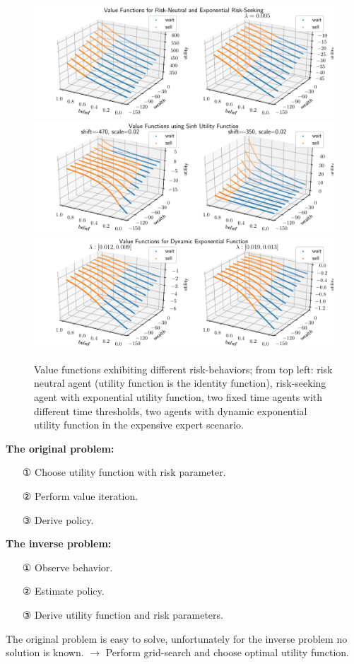 \begin{figure}
    \includegraphics[width=0.9\linewidth]{img/exp_policy.pdf}\\
    \includegraphics[width=0.9\linewidth]{img/sinh_policy.pdf}\\
    \includegraphics[width=0.9\linewidth]{img/dyn_policy.pdf}
    \caption{Value functions exhibiting different risk-behaviors; from top left: risk neutral agent (utility function is the identity function), risk-seeking agent with exponential utility function, two fixed time agents with different time thresholds, two agents with dynamic exponential utility function in the expensive expert scenario.}
\end{figure}

\textbf{The original problem:}
\begin{itemize}
\item[①] Choose utility function with risk parameter.
\item[②] Perform value iteration.
\item[③] Derive policy.
\end{itemize}

\textbf{The inverse problem:}
\begin{itemize}
\item[①] Observe behavior.
\item[②] Estimate policy.
\item[③] Derive utility function and risk parameters.
\end{itemize}

The original problem is easy to solve, unfortunately for the inverse problem no solution is known. $\rightarrow$ Perform grid-search and choose optimal utility function.
